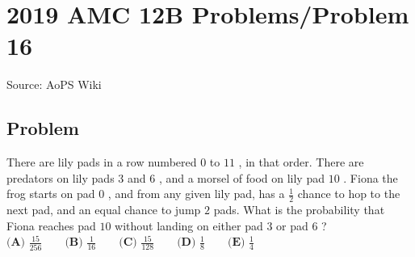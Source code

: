 \documentclass[12pt]{article}
\begin{document}
\section*{{2019 AMC 12B Problems/Problem 16}}
Source: AoPS Wiki

\subsection*{Problem}
There are lily pads in a row numbered $0$ to $11$ , in that order. There are predators on lily pads $3$ and $6$ , and a morsel of food on lily pad $10$ . Fiona the frog starts on pad $0$ , and from any given lily pad, has a $\frac{1}{2}$ chance to hop to the next pad, and an equal chance to jump $2$ pads. What is the probability that Fiona reaches pad $10$ without landing on either pad $3$ or pad $6$ ? $\textbf{(A) } \frac{15}{256} \qquad \textbf{(B) } \frac{1}{16} \qquad \textbf{(C) } \frac{15}{128}\qquad \textbf{(D) } \frac{1}{8} \qquad \textbf{(E) } \frac14$
\end{document}
